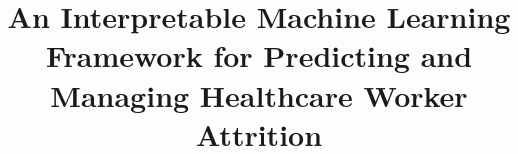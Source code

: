 \documentclass[a4paper,fleqn]{cas-sc}
\begin{document}
\let\WriteBookmarks\relax
\def\floatpagepagefraction{1}
\def\textpagefraction{.001}


\title [mode = title]{An Interpretable Machine Learning Framework for Predicting and Managing Healthcare Worker Attrition}                     




                

                


\end{document}
